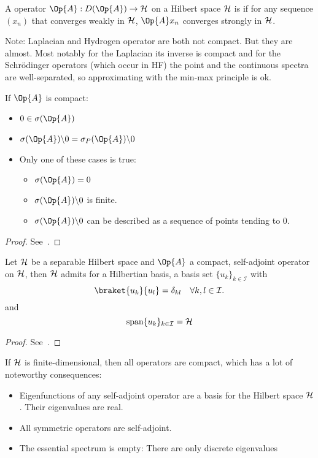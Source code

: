 \begin{defn}
	A operator $\Op{A} : D(\Op{A}) \to \hilbert$ on a Hilbert space $\mathcal{H}$
	is 
	if for any sequence $(x_n)$ that converges weakly in $\mathcal{H}$,
	$\Op{A} x_n$ converges strongly in $\mathcal{H}$.
\end{defn}

Note: Laplacian and Hydrogen operator are both not compact.
But they are almost.
Most notably for the Laplacian its inverse is compact
and for the Schrödinger operators (which occur in HF)
the point and the continuous spectra are well-separated,
so approximating with the min-max principle is ok.


\begin{prop}
	If $\Op{A}$ is compact:
	\begin{itemize}
		\item $0 \in \sigma(\Op{A})$
		\item $\sigma(\Op{A}) \backslash {0} = \sigma_P(\Op{A}) \backslash {0}$
		\item Only one of these cases is true:
			\begin{itemize}
				\item $\sigma(\Op{A}) = {0}$
				\item $\sigma(\Op{A}) \backslash {0}$ is finite.
				\item $\sigma(\Op{A}) \backslash {0}$ can be described
					as a sequence of points tending to $0$.
			\end{itemize}
	\end{itemize}
	\begin{proof}
		See~\cite[p. 56]{Helffer2013}.
	\end{proof}
\end{prop}

\begin{prop}
	Let $\mathcal{H}$ be a separable Hilbert space and $\Op{A}$ a compact,
	self-adjoint operator on $\mathcal{H}$,
	then $\mathcal{H}$ admits for a Hilbertian basis,
	\ie a basis set $\{ u_k \}_{k \in \mathcal{I}}$ with
	\[ \braket{u_k}{u_l} = \delta_{kl} \quad \forall k,l \in \mathcal{I}. \]
	and
	\[ \text{span} \{ u_k \}_{k \in \mathcal{I}} = \mathcal{H} \]
	\begin{proof}
		See~\cite[p. 60]{Helffer2013}.
	\end{proof}
\end{prop}

\begin{rem}
If $\mathcal{H}$ is finite-dimensional, then all operators are compact,
which has a lot of noteworthy consequences:
\begin{itemize}
	\item Eigenfunctions of any self-adjoint operator are a basis for the
		Hilbert space $\mathcal{H}$.
		Their eigenvalues are real.
	\item All symmetric operators are self-adjoint.
	\item The essential spectrum is empty: There are only discrete eigenvalues
\end{itemize}
\end{rem}


